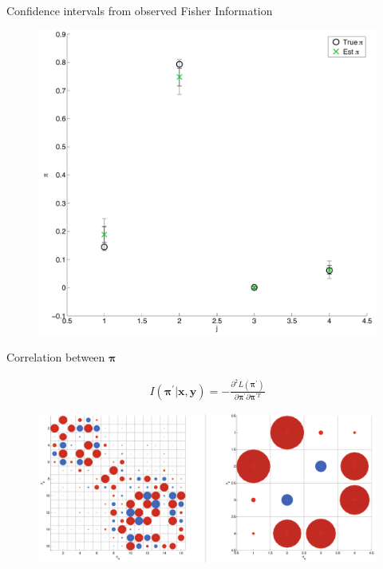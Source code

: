 \documentclass{beamer}
\newcommand{\eqn}[1]{\begin{align*}
#1
\end{align*}}
\newcommand{\vect}[1]{\boldsymbol{\mathbf{#1}}}
\newcommand{\vx}{\vect{x}}
\newcommand{\vy}{\vect{y}}
\newcommand{\vp}{\vect{\pi}}
\newcommand{\vpg}{\vp^{\prime}}
\newcommand{\llpp}{L(\vpg)}
\begin{document}
\begin{frame}{Confidence intervals from observed Fisher Information}
	
	\begin{figure}
			\begin{center}
				\includegraphics[scale=0.3]{2x2eb.pdf}
			\end{center}
	\end{figure}
	
\end{frame}










\begin{frame}{Correlation between $\vp$}
	
	\eqn{	
		I(\vpg|\vx,\vy)=-\frac{\partial^2 \llpp}{\partial \vp^\prime \partial \vp^{\prime T}}
	}		
	
	\begin{figure}
			\begin{center}
				\includegraphics[width=\textwidth]{correl.pdf}
			\end{center}
	\end{figure}	
	
\end{frame}
\end{document}
